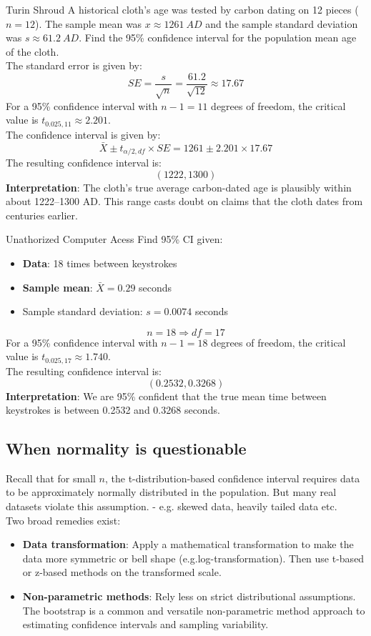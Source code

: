 \documentclass[9pt]{extarticle}
\begin{document}
\begin{examplebox}{Turin Shroud}{}
    A historical cloth's age was tested by carbon dating on 12 pieces ($n = 12$). The sample mean was $x \approx 1261 \ AD$ and the sample standard deviation was $s \approx 61.2 \ AD$. Find the 95\% confidence interval for the population mean age of the cloth. \\[2ex]
    The standard error is given by:
    $$SE = \frac{s}{\sqrt{n}} = \frac{61.2}{\sqrt{12}} \approx 17.67$$
    For a 95\% confidence interval with $n-1 = 11$ degrees of freedom, the critical value is $t_{0.025, 11} \approx 2.201$.\\
    The confidence interval is given by:
    $$\bar{X} \pm t_{\alpha/2, df} \times SE = 1261 \pm 2.201 \times 17.67$$
    The resulting confidence interval is:
    $$(1222, 1300)$$
    \textbf{Interpretation}: The cloth’s true average carbon-dated age is plausibly within about 1222–1300 AD. This range casts doubt on claims that the cloth dates from centuries earlier.
\end{examplebox}
\begin{examplebox}{Unathorized Computer Acess}{}
    Find 95\% CI given:
    \begin{itemize}
        \item \textbf{Data}: 18 times between keystrokes 
        \item \textbf{Sample mean}: $\bar{X} = 0.29$ seconds
        \item Sample standard deviation: $s = 0.0074$ seconds
    \end{itemize}
    $$n  = 18 \Rightarrow df = 17$$
    For a 95\% confidence interval with $n-1 = 18$ degrees of freedom, the critical value is $t_{0.025, 17} \approx 1.740$.\\
    The resulting confidence interval is:
    $$(0.2532, 0.3268)$$
    \textbf{Interpretation}: We are 95\% confident that the true mean time between keystrokes is between 0.2532 and 0.3268 seconds.
\end{examplebox}


\subsection{When normality is questionable}
Recall that for small $n$, the t-distribution-based confidence interval requires data to be approximately normally distributed in the population. But many real datasets violate this assumption. - e.g. skewed data, heavily tailed data etc. \\[2ex]
\noindent Two broad remedies exist:
\begin{itemize}
    \item \textbf{Data transformation}: Apply a mathematical transformation to make the data more symmetric or bell shape (e.g.log-transformation). Then use t-based or z-based methods on the transformed scale.
    \item \textbf{Non-parametric methods}: Rely less on strict distributional assumptions. The bootstrap is a common and versatile non-parametric method approach to estimating confidence intervals and sampling variability.
\end{itemize}
\end{document}
